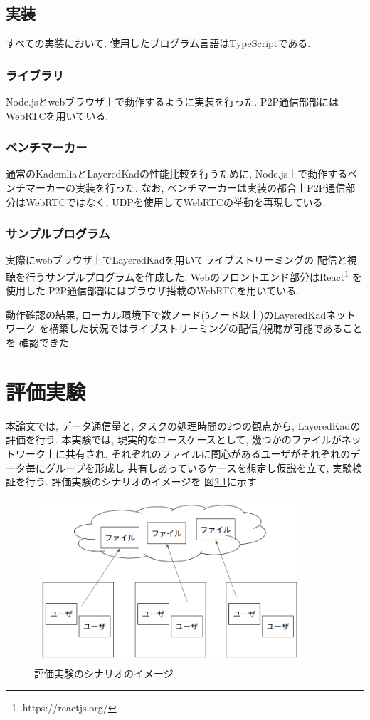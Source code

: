 \documentclass[sotsuron]{jcsie}
\begin{document}
\section{実装}
すべての実装において, 使用したプログラム言語はTypeScriptである.

\subsection{ライブラリ}
Node.jsとwebブラウザ上で動作するように実装を行った.
P2P通信部部にはWebRTCを用いている.

\subsection{ベンチマーカー}
通常のKademliaとLayeredKadの性能比較を行うために, 
Node.js上で動作するベンチマーカーの実装を行った.
なお, ベンチマーカーは実装の都合上P2P通信部分はWebRTCではなく, 
UDPを使用してWebRTCの挙動を再現している.

\subsection{サンプルプログラム}
実際にwebブラウザ上でLayeredKadを用いてライブストリーミングの
配信と視聴を行うサンプルプログラムを作成した.
Webのフロントエンド部分はReact\footnote{https://reactjs.org/}
を使用した.P2P通信部部にはブラウザ搭載のWebRTCを用いている.

動作確認の結果, ローカル環境下で数ノード(5ノード以上)のLayeredKadネットワーク
を構築した状況ではライブストリーミングの配信/視聴が可能であることを
確認できた.

\chapter{評価実験}
本論文では, データ通信量と, タスクの処理時間の2つの観点から, 
LayeredKadの評価を行う.
本実験では, 現実的なユースケースとして, 
幾つかのファイルがネットワーク上に共有され, 
それぞれのファイルに関心があるユーザがそれぞれのデータ毎にグループを形成し
共有しあっているケースを想定し仮説を立て, 実験検証を行う.
評価実験のシナリオのイメージを
図\ref{fig:trafficBenchmark}に示す.

\begin{figure}[H]
	\centering
	\includegraphics[width=10cm]{./assets/image/traffic_benchmark.png}
	\caption{評価実験のシナリオのイメージ}
	\label{fig:trafficBenchmark}
\end{figure}
\end{document}
